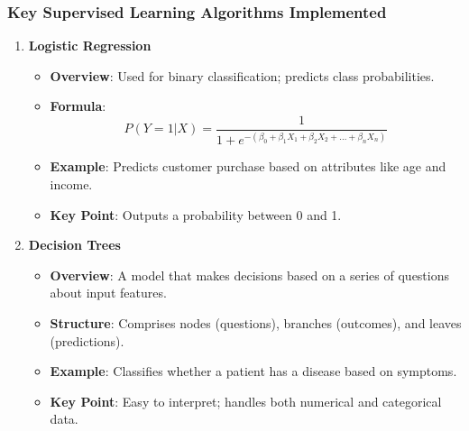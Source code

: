 \documentclass[aspectratio=169]{beamer}
\begin{document}
\begin{frame}[fragile]
    \frametitle{Key Supervised Learning Algorithms Implemented}
    \begin{enumerate}
        \item \textbf{Logistic Regression}
        \begin{itemize}
            \item \textbf{Overview}: Used for binary classification; predicts class probabilities.
            \item \textbf{Formula}:
            \[
            P(Y=1|X) = \frac{1}{1 + e^{-(\beta_0 + \beta_1 X_1 + \beta_2 X_2 + \ldots + \beta_n X_n)}}
            \]
            \item \textbf{Example}: Predicts customer purchase based on attributes like age and income.
            \item \textbf{Key Point}: Outputs a probability between 0 and 1.
        \end{itemize}
        
        \item \textbf{Decision Trees}
        \begin{itemize}
            \item \textbf{Overview}: A model that makes decisions based on a series of questions about input features.
            \item \textbf{Structure}: Comprises nodes (questions), branches (outcomes), and leaves (predictions).
            \item \textbf{Example}: Classifies whether a patient has a disease based on symptoms.
            \item \textbf{Key Point}: Easy to interpret; handles both numerical and categorical data.
        \end{itemize}
    \end{enumerate}
\end{frame}
\end{document}
